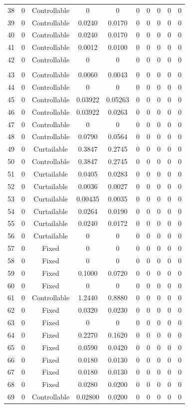 \begin{longtable}{cccccccccc}
	38 & 0 & Controllable & 0 & 0 & 0 & 0 & 0 & 0 & 0 \\
	39 & 0 & Controllable & 0.0240 & 0.0170 & 0 & 0 & 0 & 0 & 0 \\
	40 & 0 & Controllable & 0.0240 & 0.0170 & 0 & 0 & 0 & 0 & 0 \\
	41 & 0 & Controllable & 0.0012 & 0.0100 & 0 & 0 & 0 & 0 & 0 \\
	42 & 0 & Controllable & 0 & 0 & 0 & 0 & 0 & 0 & 0 \\
		\toprule  \\ 
		\toprule 
	43 & 0 & Controllable & 0.0060 & 0.0043 & 0 & 0 & 0 & 0 & 0 \\
	44 & 0 & Controllable & 0 & 0 & 0 & 0 & 0 & 0 & 0 \\
	45 & 0 & Controllable & 0.03922 & 0.05263 & 0 & 0 & 0 & 0 & 0 \\
	46 & 0 & Controllable & 0.03922 & 0.0263 & 0 & 0 & 0 & 0 & 0 \\
	47 & 0 & Controllable & 0 & 0 & 0 & 0 & 0 & 0 & 0 \\
	48 & 0 & Controllable & 0.0790 & 0.0564 & 0 & 0 & 0 & 0 & 0 \\
	49 & 0 & Curtailable & 0.3847 & 0.2745 & 0 & 0 & 0 & 0 & 0 \\
	50 & 0 & Controllable & 0.3847 & 0.2745 & 0 & 0 & 0 & 0 & 0 \\
	51 & 0 & Curtailable & 0.0405 & 0.0283 & 0 & 0 & 0 & 0 & 0 \\
	52 & 0 & Curtailable & 0.0036 & 0.0027 & 0 & 0 & 0 & 0 & 0 \\
	53 & 0 & Curtailable & 0.00435 & 0.0035 & 0 & 0 & 0 & 0 & 0 \\
	54 & 0 & Curtailable & 0.0264 & 0.0190 & 0 & 0 & 0 & 0 & 0 \\
	55 & 0 & Curtailable & 0.0240 & 0.0172 & 0 & 0 & 0 & 0 & 0 \\
	56 & 0 & Curtailable & 0 & 0 & 0 & 0 & 0 & 0 & 0 \\
	57 & 0 & Fixed & 0 & 0 & 0 & 0 & 0 & 0 & 0 \\
	58 & 0 & Fixed & 0 & 0 & 0 & 0 & 0 & 0 & 0 \\
	59 & 0 & Fixed & 0.1000 & 0.0720 & 0 & 0 & 0 & 0 & 0 \\
	60 & 0 & Fixed & 0 & 0 & 0 & 0 & 0 & 0 & 0 \\
	61 & 0 & Controllable & 1.2440 & 0.8880 & 0 & 0 & 0 & 0 & 0 \\
	62 & 0 & Fixed & 0.0320 & 0.0230 & 0 & 0 & 0 & 0 & 0 \\
	63 & 0 & Fixed & 0 & 0 & 0 & 0 & 0 & 0 & 0 \\
	64 & 0 & Fixed & 0.2270 & 0.1620 & 0 & 0 & 0 & 0 & 0 \\
	65 & 0 & Fixed & 0.0590 & 0.0420 & 0 & 0 & 0 & 0 & 0 \\
	66 & 0 & Fixed & 0.0180 & 0.0130 & 0 & 0 & 0 & 0 & 0 \\
	67 & 0 & Fixed & 0.0180 & 0.0130 & 0 & 0 & 0 & 0 & 0 \\
	68 & 0 & Fixed & 0.0280 & 0.0200 & 0 & 0 & 0 & 0 & 0 \\
	69 & 0 & Controllable & 0.02800 & 0.0200 & 0 & 0 & 0 & 0 & 0 \\
	\bottomrule %
\end{longtable}
